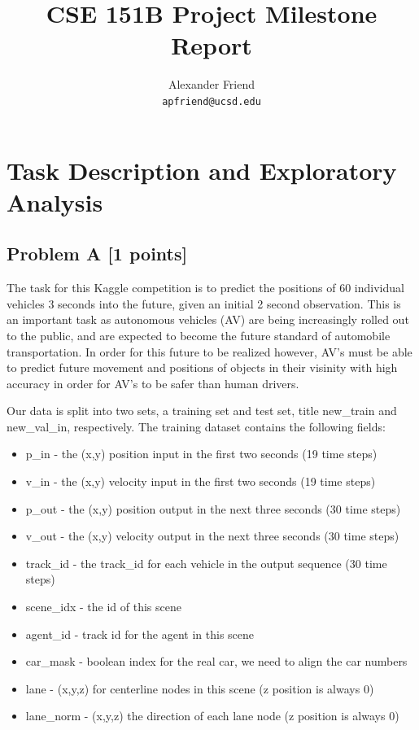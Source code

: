 \documentclass{article}
\title{CSE 151B Project Milestone Report}
\author{%
    Alexander Friend\\
    \texttt{apfriend@ucsd.edu}
}
\begin{document}
\maketitle


\section{Task Description and Exploratory Analysis}
    \subsection{Problem A [1 points]}        
        
        The task for this Kaggle competition is to predict the positions of 60 individual 
        vehicles 3 seconds into the future, given an initial 2 second observation. This is 
        an important task as autonomous vehicles (AV) are being increasingly rolled out to the public,
        and are expected to become the future standard of automobile transportation. In order 
        for this future to be realized however, AV's must be able to predict future movement and positions
        of objects in their visinity with high accuracy in order for AV's to be safer than human drivers.

        Our data is split into two sets, a training set and test set, title {\selectfont new\_train} and 
        {\selectfont new\_val\_in}, respectively. The training dataset contains the following fields: 
        
        \begin{itemize}            
            \item {\selectfont p\_in} - the (x,y) position input in the first two seconds (19 time steps)
            \item {\selectfont v\_in} - the (x,y) velocity input in the first two seconds (19 time steps)
            \item {\selectfont p\_out} - the (x,y) position output in the next three seconds (30 time steps)
            \item {\selectfont v\_out} - the (x,y) velocity output in the next three seconds (30 time steps)
            \item {\selectfont track\_id} - the track\_id for each vehicle in the output sequence (30 time steps)
            \item {\selectfont scene\_idx} - the id of this scene
            \item {\selectfont agent\_id} - track id for the agent in this scene
            \item {\selectfont car\_mask} - boolean index for the real car, we need to align the car numbers
            \item {\selectfont lane} - (x,y,z) for centerline nodes in this scene (z position is always $0$)
            \item {\selectfont lane\_norm} - (x,y,z) the direction of each lane node (z position is always $0$)
        \end{itemize}
\end{document}
